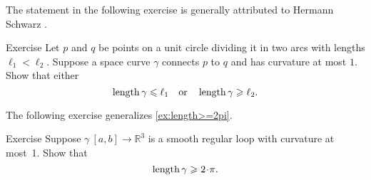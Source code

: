 The statement in the following exercise is generally attributed to Hermann Schwarz \cite{shur}.

\begin{thm}{Exercise}\label{ex:schwartz}
Let $p$ and $q$ be points on a unit circle dividing it in two arcs with lengths $\ell_1<\ell_2$.
Suppose a space curve $\gamma$ connects $p$ to $q$ and has curvature at most $1$.
Show that either
\[\mathop{\rm length}\nolimits \gamma\leqslant \ell_1
\quad\text{or}\quad
\mathop{\rm length}\nolimits \gamma\geqslant \ell_2.
\]
\end{thm}

The following exercise generalizes \ref{ex:length>=2pi}.

\begin{thm}{Exercise}\label{ex:loop}
Suppose $\gamma\:[a,b]\to \mathbb{R}^3$ is a smooth regular loop with curvature at most~1.
Show that 
\[\length\gamma\ge2\cdot\pi.\]

\end{thm}


